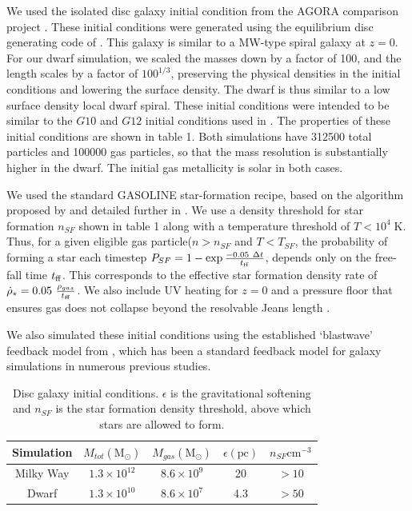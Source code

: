 We used the isolated disc galaxy initial condition from the AGORA comparison
project \citep{Kim2013}.  These initial conditions were generated using the
equilibrium disc generating code of \citet{Springel2005}.
This galaxy is similar to a MW-type spiral galaxy
at $z=0$.  For our dwarf simulation, we scaled the masses down by a factor of
100, and the length scales by a factor of $100^{1/3}$, preserving the physical
densities in the initial conditions and lowering the surface density.  The dwarf
is thus similar to a low surface density local dwarf spiral.  These initial
conditions were intended to be similar to the $G10$ and $G12$ initial conditions
used in \citet{DallaVecchia2012}. The properties of these initial conditions are
shown in table 1.  Both simulations have 312500 total particles and 100000 gas
particles, so that the mass resolution is substantially higher in the dwarf.  The
initial gas metallicity is solar in both cases.

We used the standard {\sc GASOLINE} star-formation recipe, based on the
algorithm proposed by \citet{Katz1992} and detailed further in
\citet{Stinson2006}.  We use a density threshold for star formation $n_{SF}$
shown in table 1 along with a temperature threshold of $T < 10^4\;\mathrm{K}$.
Thus, for a given eligible gas particle($n>n_{SF}$ and $T<T_{SF}$, the
probability of forming a star each timestep $P_{SF} = 1-\exp{-0.05\ \Delta
t\over t_{\rm ff}}$, depends only on the free-fall time $t_{\rm ff}$.  This
corresponds to the effective star formation density rate of $\dot \rho_* = 0.05\
\frac{\rho_{gas}}{t_{\rm ff}}$.  We also include UV heating for $z=0$ \citep[as
in][]{Shen2010} and a pressure floor that ensures gas does not collapse beyond
the resolvable Jeans length \citep{Machacek2001}.  

We also simulated these initial conditions using the established `blastwave'
feedback model from \citet{Stinson2006}, which has been a standard feedback
model for galaxy simulations in numerous previous studies.
\begin{table}
    \begin{tabular}{ c c c c c}
        \hline
        Simulation & $M_{tot} \mathrm{(M_\odot)}$ & $M_{gas} \mathrm{(M_\odot)}$
        & $\epsilon \mathrm{(pc)}$ & $n_{SF} \mathrm{cm^{-3}}$\\
        \hline
        Milky Way & $1.3\times10^{12}$ & $8.6\times10^9$ & 20  & $>10$\\
        Dwarf & $1.3\times10^{10}$ &  $8.6\times10^7$ & 4.3 & $>50$\\
    \end{tabular}
    \caption[Isolated Disc Initial Conditions]{Disc galaxy initial conditions.  $\epsilon$ is the gravitational
    softening and $n_{SF}$ is the star formation density threshold, above which
    stars are allowed to form.}
\end{table}

